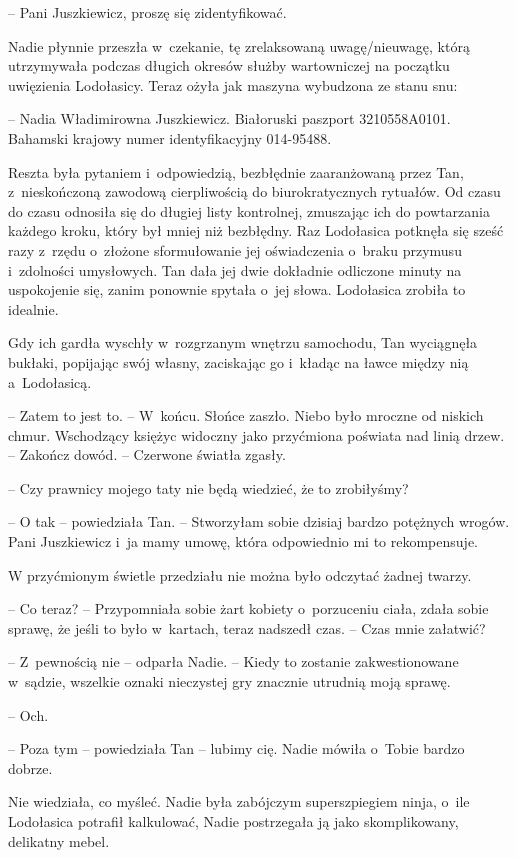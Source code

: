 \documentclass[oneside,polish,11pt,sfheadings]{mwbk}
\begin{document}
-- Pani Juszkiewicz, proszę się zidentyfikować.

Nadie płynnie przeszła w~czekanie, tę zrelaksowaną uwagę/nieuwagę, którą
utrzymywała podczas długich okresów służby wartowniczej na początku
uwięzienia Lodołasicy. Teraz ożyła jak maszyna wybudzona ze stanu snu: 

-- Nadia Władimirowna Juszkiewicz. Białoruski paszport 3210558A0101.
Bahamski krajowy numer identyfikacyjny 014-95488.

Reszta była pytaniem i~odpowiedzią, bezbłędnie zaaranżowaną przez Tan, z~nieskończoną zawodową cierpliwością do biurokratycznych rytuałów. Od
czasu do czasu odnosiła się do długiej listy kontrolnej, zmuszając ich
do powtarzania każdego kroku, który był mniej niż bezbłędny. Raz
Lodołasica potknęła się sześć razy z~rzędu o~złożone sformułowanie jej
oświadczenia o~braku przymusu i~zdolności umysłowych. Tan dała jej dwie
dokładnie odliczone minuty na uspokojenie się, zanim ponownie spytała o~jej słowa. Lodołasica zrobiła to idealnie.

Gdy ich gardła wyschły w~rozgrzanym wnętrzu samochodu, Tan wyciągnęła
bukłaki, popijając swój własny, zaciskając go i~kładąc na ławce między
nią a~Lodołasicą.

-- Zatem to jest to. -- W~końcu. Słońce zaszło. Niebo było mroczne od
niskich chmur. Wschodzący księżyc widoczny jako przyćmiona poświata nad
linią drzew. -- Zakończ dowód. -- Czerwone światła zgasły.

-- Czy prawnicy mojego taty nie będą wiedzieć, że to zrobiłyśmy?

-- O tak -- powiedziała Tan. -- Stworzyłam sobie dzisiaj bardzo potężnych
wrogów. Pani Juszkiewicz i~ja mamy umowę, która odpowiednio mi to
rekompensuje.

W przyćmionym świetle przedziału nie można było odczytać żadnej twarzy.

-- Co teraz? -- Przypomniała sobie żart kobiety o~porzuceniu ciała, zdała
sobie sprawę, że jeśli to było w~kartach, teraz nadszedł czas. -- Czas
mnie załatwić?

-- Z~pewnością nie -- odparła Nadie. -- Kiedy to zostanie zakwestionowane w~sądzie, wszelkie oznaki nieczystej gry znacznie utrudnią moją sprawę.

-- Och.

-- Poza tym -- powiedziała Tan -- lubimy cię. Nadie mówiła o~Tobie bardzo
dobrze.

Nie wiedziała, co myśleć. Nadie była zabójczym superszpiegiem ninja, o~ile Lodołasica potrafił kalkulować, Nadie postrzegała ją jako
skomplikowany, delikatny mebel.
\end{document}
